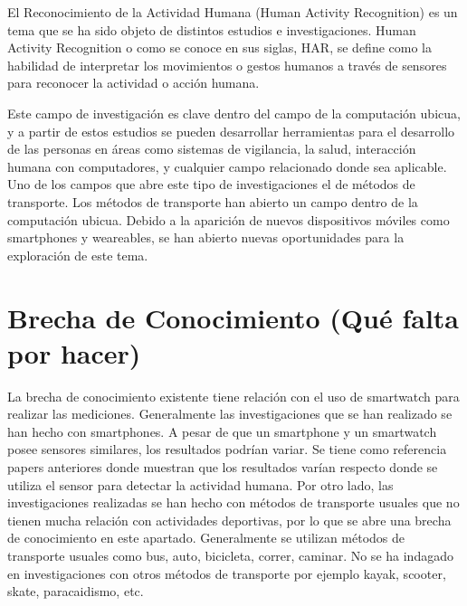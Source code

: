 
El Reconocimiento de la Actividad Humana\cite{Humanactivityrecognition} (Human Activity Recognition) es un tema que se ha sido objeto de distintos estudios e investigaciones. 
Human Activity Recognition o como se conoce en sus siglas, HAR, se define como la habilidad de interpretar los movimientos o gestos humanos a través de sensores para reconocer la actividad o acción humana.\cite{10.1007/s11390-011-9430-9}

Este campo de investigación es clave dentro del campo de la computación ubicua\cite{10.5555/2832747.2832806}, y a partir de estos estudios se pueden desarrollar herramientas para el desarrollo de las personas en áreas como sistemas de vigilancia\cite{10.1007/s11390-011-9430-9}, la salud\cite{10.1145/3195106.3195157}, interacción humana con computadores\cite{10.1007/s11390-011-9430-9}, y cualquier campo relacionado donde sea aplicable. \newline
Uno de los campos que abre este tipo de investigaciones el de métodos de transporte\cite{Efthymiou2019}. Los métodos de transporte han abierto un campo dentro de la computación ubicua. Debido a la aparición de nuevos dispositivos móviles como smartphones y weareables, se han abierto nuevas oportunidades para la exploración de este tema.



\section{Brecha de Conocimiento (Qué falta por hacer)}

La brecha de conocimiento existente tiene relación con el uso de smartwatch para realizar las mediciones. Generalmente las investigaciones que se han realizado se han hecho con smartphones. A pesar de que un smartphone y un smartwatch posee sensores similares, los resultados podrían variar. Se tiene como referencia papers anteriores donde muestran que los resultados varían respecto donde se utiliza el sensor para detectar la actividad humana.
Por otro lado, las investigaciones realizadas se han hecho con métodos de transporte usuales que no tienen mucha relación con actividades deportivas, por lo que se abre una brecha de conocimiento en este apartado. Generalmente se utilizan métodos de transporte usuales como bus, auto, bicicleta, correr, caminar. No se ha indagado en investigaciones con otros métodos de transporte por ejemplo kayak, scooter, skate, paracaidismo, etc. 


